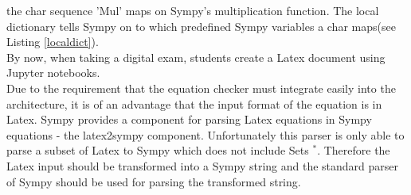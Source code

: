         the char sequence 'Mul' maps on Sympy's multiplication function. The local dictionary tells Sympy on to which predefined Sympy variables a char maps(see Listing \ref{localdict}).\\
        By now, when taking a digital exam, students create a Latex document using Jupyter notebooks.\\
        Due to the requirement that the equation checker must integrate easily into the architecture, it is of an advantage that the input format of the equation is in Latex.
        Sympy provides a component for parsing Latex equations in Sympy equations - the latex2sympy component.
        Unfortunately this parser is only able
        to parse a subset of Latex to Sympy which does not include Sets $^{\ast}$. Therefore the Latex input should be transformed into a Sympy string and the standard
        parser of Sympy should be used for parsing the transformed string.

